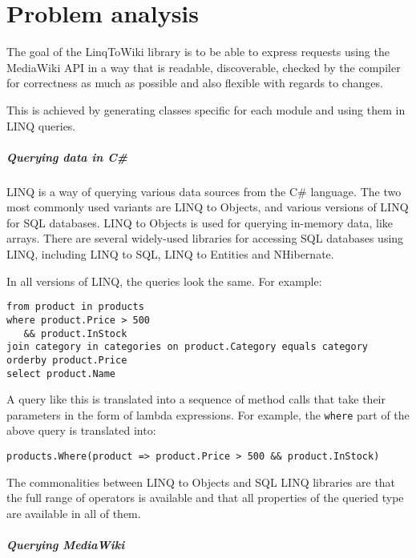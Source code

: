 \chapter{Problem analysis}
\label{goal}

The goal of the LinqToWiki library is to be able to express requests using the MediaWiki \ac{API}
in a way that is readable, discoverable, checked by the compiler for correctness as much as possible and also flexible with regards to changes.

This is achieved by generating classes specific for each module and using them in LINQ queries.

\paragraph{Querying data in C\#}

\ac{LINQ} is a way of querying various data sources from the C\# language.
The two most commonly used variants are LINQ to Objects, and various versions of LINQ for \ac{SQL} databases.
LINQ to Objects is used for querying in-memory data, like arrays.
There are several widely-used libraries for accessing \ac{SQL} databases using LINQ, including LINQ to SQL, LINQ to Entities and NHibernate.

In all versions of \ac{LINQ}, the queries look the same. For example:

\begin{lstlisting}
from product in products
where product.Price > 500
   && product.InStock
join category in categories on product.Category equals category
orderby product.Price
select product.Name
\end{lstlisting}

A query like this is translated into a sequence of method calls that take their parameters in the form of lambda expressions.
For example, the \lstinline{where} part of the above query is translated into:

\begin{lstlisting}
products.Where(product => product.Price > 500 && product.InStock)
\end{lstlisting}

The commonalities between LINQ to Objects and SQL LINQ libraries are that the full range of operators is available
and that all properties of the queried type are available in all of them.

\paragraph{Querying MediaWiki}

